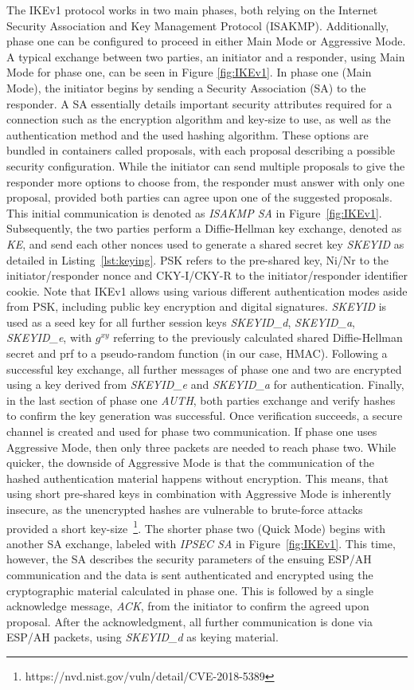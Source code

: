 The IKEv1 protocol works in two main phases, both relying on the Internet Security Association and Key Management Protocol (ISAKMP). Additionally, phase one can be configured to proceed in either Main Mode or Aggressive Mode. A typical exchange between two parties, an initiator and a responder, using Main Mode for phase one, can be seen in Figure \ref{fig:IKEv1}. In phase one (Main Mode), the initiator begins by sending a Security Association (SA) to the responder. A SA essentially details important security attributes required for a connection such as the encryption algorithm and key-size to use, as well as the authentication method and the used hashing algorithm. These options are bundled in containers called proposals, with each proposal describing a possible security configuration. While the initiator can send multiple proposals to give the responder more options to choose from, the responder must answer with only one proposal, provided both parties can agree upon one of the suggested proposals. This initial communication is denoted as \emph{ISAKMP SA} in Figure~\ref{fig:IKEv1}. Subsequently, the two parties perform a Diffie-Hellman key exchange, denoted as \emph{KE}, and send each other nonces used to generate a shared secret key \emph{SKEYID} as detailed in Listing~\ref{lst:keying}. PSK refers to the pre-shared key, Ni/Nr to the initiator/responder nonce and CKY-I/CKY-R to the initiator/responder identifier cookie. Note that IKEv1 allows using various different authentication modes aside from PSK, including public key encryption and digital signatures. \emph{SKEYID} is used as a seed key for all further session keys \emph{SKEYID\_d}, \emph{SKEYID\_a}, \emph{SKEYID\_e}, with $g^{xy}$ referring to the previously calculated shared Diffie-Hellman secret and prf to a pseudo-random function (in our case, HMAC). Following a successful key exchange, all further messages of phase one and two are encrypted using a key derived from \emph{SKEYID\_e} and \emph{SKEYID\_a} for authentication. Finally, in the last section of phase one \emph{AUTH}, both parties exchange and verify hashes to confirm the key generation was successful. Once verification succeeds, a secure channel is created and used for phase two communication. If phase one uses Aggressive Mode, then only three packets are needed to reach phase two. While quicker, the downside of Aggressive Mode is that the communication of the hashed authentication material happens without encryption. This means, that using short pre-shared keys in combination with Aggressive Mode is inherently insecure, as the unencrypted hashes are vulnerable to brute-force attacks provided a short key-size~\footnote{https://nvd.nist.gov/vuln/detail/CVE-2018-5389}. The shorter phase two (Quick Mode) begins with another SA exchange, labeled with \emph{IPSEC SA} in Figure~\ref{fig:IKEv1}. This time, however, the SA describes the security parameters of the ensuing ESP/AH communication and the data is sent authenticated and encrypted using the cryptographic material calculated in phase one. This is followed by a single acknowledge message, \emph{ACK}, from the initiator to confirm the agreed upon proposal. After the acknowledgment, all further communication is done via ESP/AH packets, using \emph{SKEYID\_d} as keying material.

